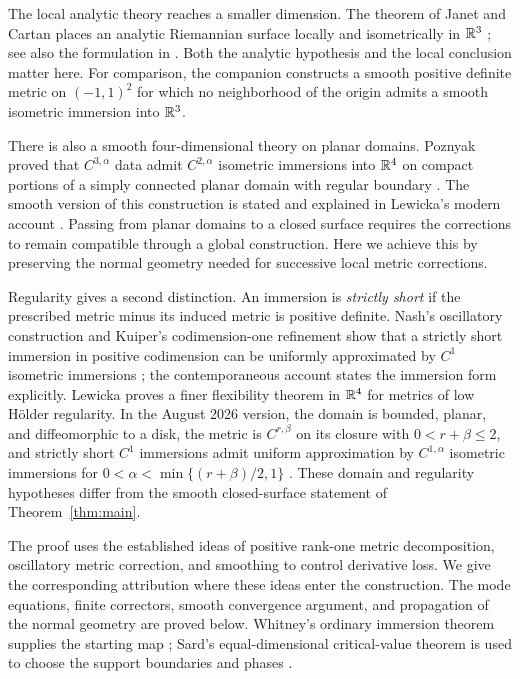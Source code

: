 The local analytic theory reaches a smaller dimension. The theorem of
Janet and Cartan places an analytic Riemannian surface locally and
isometrically in $\mathbb{R}^3$ \cite{Janet1926,Cartan1927}; see also the
formulation in \cite[\S1.2]{Gromov2015}.
Both the analytic hypothesis and the local conclusion matter here.
For comparison, the companion \cite[Theorem~A]{OpenAILocalObstruction2026}
constructs a smooth positive definite metric on $(-1,1)^2$ for which no
neighborhood of the origin admits a smooth isometric immersion into $\mathbb{R}^3$.

There is also a smooth four-dimensional theory on planar domains.
Poznyak proved that $C^{3,\alpha}$ data admit $C^{2,\alpha}$ isometric
immersions into $\mathbb{R}^4$ on compact portions of a simply connected planar
domain with regular boundary \cite[Theorem~4, p.~67]{Poznyak1973}.
The smooth version of this construction is stated and explained in
Lewicka's modern account \cite[Theorem~9.1, p.~57]{Lewicka2026v3}.
Passing from planar domains to a closed surface requires the corrections
to remain compatible through a global construction. Here we achieve this
by preserving the normal geometry needed for successive local metric
corrections.

Regularity gives a second distinction. An immersion is \emph{strictly short}
if the prescribed metric minus its induced metric is positive definite.
Nash's oscillatory construction and Kuiper's codimension-one refinement show
that a strictly short immersion in positive codimension can be uniformly
approximated by $C^1$ isometric
immersions \cite{Nash1954,Kuiper1955}; the contemporaneous account
\cite[Theorems~1--2]{Choquet1958} states the immersion form explicitly.
Lewicka proves a finer flexibility theorem in $\mathbb{R}^4$ for metrics of low
H\"older regularity. In the August 2026 version, the domain is bounded,
planar, and diffeomorphic to a disk, the metric is $C^{r,\beta}$ on its
closure with $0<r+\beta\le2$, and strictly short $C^1$ immersions admit
uniform approximation by $C^{1,\alpha}$ isometric immersions for
$0<\alpha<\min\{(r+\beta)/2,1\}$
\cite[Theorem~1.1, p.~2]{Lewicka2026v3}.
These domain and regularity hypotheses differ from the smooth
closed-surface statement of Theorem~\ref{thm:main}.

The proof uses the established ideas of positive rank-one metric
decomposition, oscillatory metric correction, and smoothing to control
derivative loss. We give the corresponding attribution where these ideas
enter the construction. The mode equations, finite correctors, smooth
convergence argument, and propagation of the normal geometry are proved
below. Whitney's ordinary immersion theorem supplies the starting map
\cite[Theorem~8, p.~274]{Whitney1944}; Sard's equal-dimensional
critical-value theorem is used to choose the support boundaries and phases
\cite[Theorem~4.1, p.~885]{Sard1942}.

